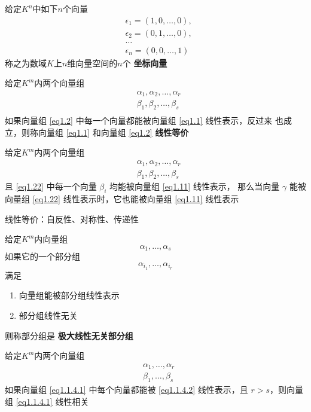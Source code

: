 \documentclass[11pt]{article}
\begin{document}
给定\(K^n\)中如下\(n\)个向量
\begin{align*}
&\epsilon_1=(1,0,\dots,0),\\
&\epsilon_2=(0,1,\dots,0),\\
&\dots\\
&\epsilon_n=(0,0,\dots,1)
\end{align*}
称之为数域\(K\)上\(n\)维向量空间的\(n\)个 \textbf{坐标向量}

\begin{definition}[]
给定\(K^m\)内两个向量组
\begin{align}
&   \alpha_1,\alpha_2,\dots,\alpha_r\label{eq1.1}\\
&\beta_1,\beta_2,\dots,\beta_s\label{eq1.2}\\
\end{align}
如果向量组 \eqref{eq1.2} 中每一个向量都能被向量组 \eqref{eq1.1} 线性表示，反过来
也成立，则称向量组 \eqref{eq1.1} 和向量组 \eqref{eq1.2} \textbf{线性等价}
\end{definition}

\begin{proposition}[]
给定\(K^m\)内两个向量组
\begin{align}
&\alpha_1,\alpha_2,\dots,\alpha_r\label{eq1.11}\\
&\beta_1,\beta_2,\dots,\beta_s\label{eq1.22}
\end{align}
且 \eqref{eq1.22} 中每一个向量 \(\beta_i\) 均能被向量组 \eqref{eq1.11} 线性表示，
那么当向量 \(\gamma\) 能被向量组 \eqref{eq1.22} 线性表示时，它也能被向量组 \eqref{eq1.11}
线性表示
\end{proposition}

线性等价：自反性、对称性、传递性

\begin{definition}[]
给定\(K^m\)内向量组
\begin{equation*}
\alpha_1,\dots,\alpha_s
\end{equation*}
如果它的一个部分组
\begin{equation*}
\alpha_{i_1},\dots,\alpha_{i_r}
\end{equation*}
满足
\begin{enumerate}
\item 向量组能被部分组线性表示
\item 部分组线性无关
\end{enumerate}


则称部分组是 \textbf{极大线性无关部分组}
\end{definition}

\begin{proposition}[]
给定\(K^m\)内两个向量组
\begin{align}
&\alpha_1,\dots,\alpha_r\label{eq1.1.4.1}\\
&\beta_1,\dots,\beta_s\label{eq1.1.4.2}
\end{align}
如果向量组 \eqref{eq1.1.4.1} 中每个向量都能被 \eqref{eq1.1.4.2} 线性表示，且
\(r\iffalse<\fi>s\)，则向量组 \eqref{eq1.1.4.1} 线性相关
\end{proposition}
\end{document}
